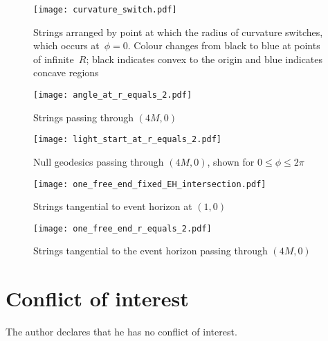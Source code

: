 \begin{figure}[p]
\centering
\texttt{[image: curvature\_switch.pdf]} %
\caption{Strings arranged by point at which the radius of curvature
  switches, which occurs at~$\phi=0$.  Colour changes from black to
  blue at points of infinite~$R$; black indicates convex to the origin
  and blue indicates concave regions}
\label{curvature_switch}
\end{figure}

\begin{figure}[p]
\centering
\texttt{[image: angle\_at\_r\_equals\_2.pdf]} %
\caption{Strings passing through $(4M,0)$}
\label{strings_r_equals_2}
\end{figure}

\begin{figure}[p]
\centering
\texttt{[image: light\_start\_at\_r\_equals\_2.pdf]} %
\caption{Null geodesics passing through $(4M,0)$, shown for $0\leq\phi\leq 2\pi$}
\label{light_r_equals_2}
\end{figure}

\begin{figure}[p] %
\centering
\texttt{[image: one\_free\_end\_fixed\_EH\_intersection.pdf]}
\caption{Strings tangential to event horizon at $(1,0)$}
\label{fixed_EH_intersection}
\end{figure}

\begin{figure}[p] %
\centering
\texttt{[image: one\_free\_end\_r\_equals\_2.pdf]}
\caption{Strings tangential to the event horizon passing through $(4M,0)$}
\label{one_free_end_r_equals_2}
\end{figure}



 \section*{Conflict of interest}
 The author declares that he has no conflict of interest.





 

